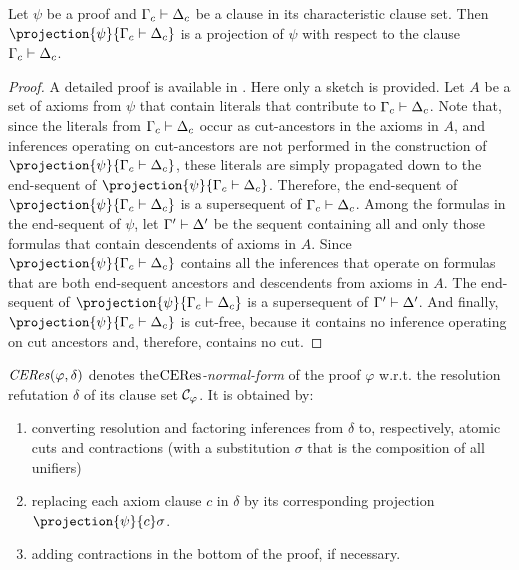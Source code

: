 \begin{theorem}
Let $\psi$ be a proof and $\Gamma_c \vdash \Delta_c$ be a clause in its characteristic clause set. Then $\projection{\psi}{\Gamma_c \seq \Delta_c}$ is a projection of $\psi$ with respect to the clause $\Gamma_c \vdash \Delta_c$.
\end{theorem}
\begin{proof}
A detailed proof is available in \cite{ToDo}. Here only a sketch is provided. Let $A$ be a set of axioms from $\psi$ that contain literals that contribute to $\Gamma_c \vdash \Delta_c$. Note that, since the literals from $\Gamma_c \vdash \Delta_c$ occur as cut-ancestors in the axioms in $A$, and inferences operating on cut-ancestors are not performed in the construction of $\projection{\psi}{\Gamma_c \seq \Delta_c}$, these literals are simply propagated down to the end-sequent of $\projection{\psi}{\Gamma_c \seq \Delta_c}$. Therefore, the end-sequent of $\projection{\psi}{\Gamma_c \seq \Delta_c}$ is a supersequent of $\Gamma_c \vdash \Delta_c$. Among the formulas in the end-sequent of $\psi$, let $\Gamma' \vdash \Delta'$ be the sequent containing all and only those formulas that contain descendents of axioms in $A$. Since $\projection{\psi}{\Gamma_c \seq \Delta_c}$ contains all the inferences that operate on formulas that are both end-sequent ancestors and descendents from axioms in $A$. The end-sequent of $\projection{\psi}{\Gamma_c \seq \Delta_c}$ is a supersequent of $\Gamma' \vdash \Delta'$. And finally, $\projection{\psi}{\Gamma_c \seq \Delta_c}$ is cut-free, because it contains no inference operating on cut ancestors and, therefore, contains no cut.
\end{proof}


\begin{definition}
$\mathit{CERes}(\varphi,\delta)$ denotes the\emph{$\mathrm{CERes}$-normal-form} of the proof $\varphi$ w.r.t. the resolution refutation $\delta$ of its clause set $\mathcal{C}_{\varphi}$. It is obtained by:
\begin{enumerate}
\item converting resolution and factoring inferences from $\delta$ to, respectively, atomic cuts and contractions (with a substitution $\sigma$ that is the composition of all unifiers)
\item replacing each axiom clause $c$ in $\delta$ by its corresponding projection $\projection{\psi}{c} \sigma$.
\item adding contractions in the bottom of the proof, if necessary.
\end{enumerate} 
\end{definition}



